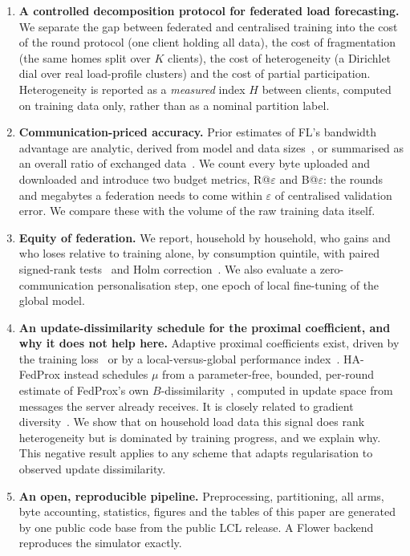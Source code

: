 \begin{enumerate}
\item \textbf{A controlled decomposition protocol for federated load forecasting.} We separate the gap between
federated and centralised training into the cost of the round protocol (one client holding all data), the cost of
fragmentation (the same homes split over $K$ clients), the cost of heterogeneity (a Dirichlet dial over real
load-profile clusters) and the cost of partial participation. Heterogeneity is reported as a \emph{measured}
index $H$ between clients, computed on training data only, rather than as a nominal partition label.
\item \textbf{Communication-priced accuracy.} Prior estimates of FL's bandwidth advantage are analytic, derived from model and data
sizes~\cite{taik2020}, or summarised as an overall ratio of exchanged data~\cite{savi2021}. We count every byte uploaded and downloaded and introduce two
budget metrics, R@$\varepsilon$ and B@$\varepsilon$: the rounds and megabytes a federation needs to come within
$\varepsilon$ of centralised validation error. We compare these with the volume of the raw training data itself.
\item \textbf{Equity of federation.} We report, household by household, who gains and who loses relative to training
alone, by consumption quintile, with paired signed-rank tests~\cite{wilcoxon1945} and Holm
correction~\cite{holm1979}. We also evaluate a zero-communication personalisation step, one epoch of local fine-tuning
of the global model.
\item \textbf{An update-dissimilarity schedule for the proximal coefficient, and why it does not help here.}
Adaptive proximal coefficients exist, driven by the training loss~\cite{li2020fedprox} or by a local-versus-global
performance index~\cite{mhou2025hapi}. HA-FedProx instead schedules $\mu$ from a parameter-free, bounded, per-round
estimate of FedProx's own $B$-dissimilarity~\cite{li2020fedprox}, computed in update space from messages the
server already receives. It is closely related to gradient diversity~\cite{yin2018diversity}. We show that on
household load data this signal does rank heterogeneity but is dominated by training progress, and we explain why. This
negative result applies to any scheme that adapts regularisation to observed update dissimilarity.
\item \textbf{An open, reproducible pipeline.} Preprocessing, partitioning, all arms, byte accounting, statistics,
figures and the tables of this paper are generated by one public code base from the public LCL release. A Flower
backend~\cite{beutel2020flower} reproduces the simulator exactly.
\end{enumerate}

